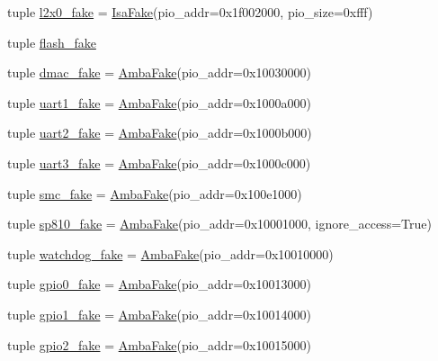 \begin{DoxyCompactItemize}
\item 
tuple \hyperlink{classRealView_1_1RealViewPBX_a58c42fcf23ff778110e667e2df1fbb6f}{l2x0\_\-fake} = \hyperlink{classIsaFake}{IsaFake}(pio\_\-addr=0x1f002000, pio\_\-size=0xfff)
\item 
tuple \hyperlink{classRealView_1_1RealViewPBX_a6dbb35031fbd3dbded6e05ca5db58c8e}{flash\_\-fake}
\item 
tuple \hyperlink{classRealView_1_1RealViewPBX_acbc3f8e786184963ae1388d9d9a981be}{dmac\_\-fake} = \hyperlink{classRealView_1_1AmbaFake}{AmbaFake}(pio\_\-addr=0x10030000)
\item 
tuple \hyperlink{classRealView_1_1RealViewPBX_ae8df5f47228f3c94133173ef497a4203}{uart1\_\-fake} = \hyperlink{classRealView_1_1AmbaFake}{AmbaFake}(pio\_\-addr=0x1000a000)
\item 
tuple \hyperlink{classRealView_1_1RealViewPBX_a0c7e8be915fc7946adb67f2522bf26b1}{uart2\_\-fake} = \hyperlink{classRealView_1_1AmbaFake}{AmbaFake}(pio\_\-addr=0x1000b000)
\item 
tuple \hyperlink{classRealView_1_1RealViewPBX_ac8f4703047b3e05e27410c2c79b2f043}{uart3\_\-fake} = \hyperlink{classRealView_1_1AmbaFake}{AmbaFake}(pio\_\-addr=0x1000c000)
\item 
tuple \hyperlink{classRealView_1_1RealViewPBX_ae5f924bae96d172d477be2bfc6df2004}{smc\_\-fake} = \hyperlink{classRealView_1_1AmbaFake}{AmbaFake}(pio\_\-addr=0x100e1000)
\item 
tuple \hyperlink{classRealView_1_1RealViewPBX_a42d6450a02aa42b77cd21f39eb6a3fbb}{sp810\_\-fake} = \hyperlink{classRealView_1_1AmbaFake}{AmbaFake}(pio\_\-addr=0x10001000, ignore\_\-access=True)
\item 
tuple \hyperlink{classRealView_1_1RealViewPBX_a6dfafd229651b87c734e8433a613a8a4}{watchdog\_\-fake} = \hyperlink{classRealView_1_1AmbaFake}{AmbaFake}(pio\_\-addr=0x10010000)
\item 
tuple \hyperlink{classRealView_1_1RealViewPBX_a290572125413a30d7e52e4bdeff0f6fd}{gpio0\_\-fake} = \hyperlink{classRealView_1_1AmbaFake}{AmbaFake}(pio\_\-addr=0x10013000)
\item 
tuple \hyperlink{classRealView_1_1RealViewPBX_aa30da97211a9426c3ce02c4e868d7203}{gpio1\_\-fake} = \hyperlink{classRealView_1_1AmbaFake}{AmbaFake}(pio\_\-addr=0x10014000)
\item 
tuple \hyperlink{classRealView_1_1RealViewPBX_ad5e65e2358629c72cc90cf5dc3bdb8ab}{gpio2\_\-fake} = \hyperlink{classRealView_1_1AmbaFake}{AmbaFake}(pio\_\-addr=0x10015000)
\item 

\end{DoxyCompactItemize}
